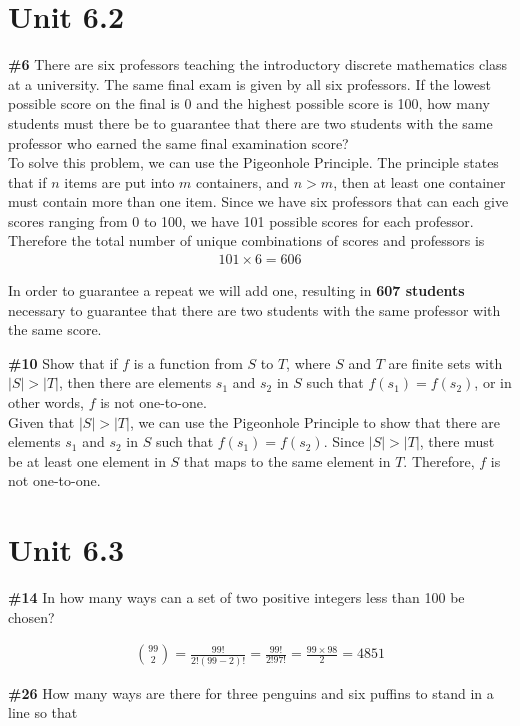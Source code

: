 \documentclass{article}
\newcommand{\unit}[1]{\section{Unit #1}}
\newcommand{\problem}[1]{\textbf{\##1}}
\newcommand{\prob}[1]{\problem{#1}}
\begin{document}
\pagebreak

\unit{6.2}
\prob{6}
There are six professors teaching the introductory discrete mathematics class at a university. The same ﬁnal exam is given by all six professors. If the lowest possible score on the ﬁnal is 0 and the highest possible score is 100, how many students must there be to guarantee that there are two students with the same professor who earned the same ﬁnal examination score?\\

To solve this problem, we can use the Pigeonhole Principle. The principle states that if \(n\) items are put into \(m\) containers, and \(n>m\), then at least one container must contain more than one item. Since we have six professors that can each give scores ranging from 0 to 100, we have 101 possible scores for each professor. Therefore the total number of unique combinations of scores and professors is
\begin{align*}
    101 \times 6 = 606
\end{align*}

In order to guarantee a repeat we will add one, resulting in \textbf{607 students} necessary to guarantee that there are two students with the same professor with the same score.

\pagebreak
\prob{10}
Show that if \(f\) is a function from \(S\) to \(T\), where \(S\) and \(T\) are finite sets with \(|S| > |T|\), then there are elements \(s_1\) and \(s_2\) in \(S\) such that \(f(s_1) = f(s_2)\), or in other words, \(f\) is not one-to-one.\\

Given that \(|S| > |T|\), we can use the Pigeonhole Principle to show that there are elements \(s_1\) and \(s_2\) in \(S\) such that \(f(s_1) = f(s_2)\). Since \(|S| > |T|\), there must be at least one element in \(S\) that maps to the same element in \(T\). Therefore, \(f\) is not one-to-one.

\pagebreak

\unit{6.3}
\prob{14}
In how many ways can a set of two positive integers less than 100 be chosen?

\begin{align*}
    \binom{99}{2} = \frac{99!}{2!(99-2)!} = \frac{99!}{2!97!} = \frac{99 \times 98}{2} = 4851
\end{align*}

\pagebreak
\prob{26}
How many ways are there for three penguins and six puﬃns to stand in a line so that\\
\end{document}
